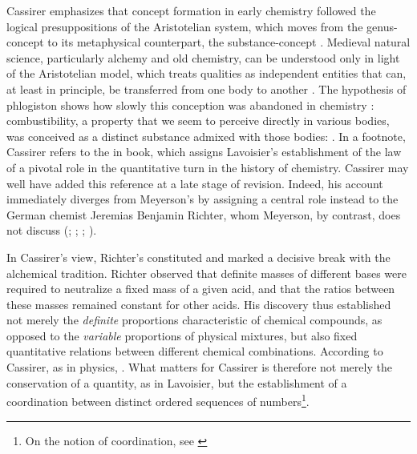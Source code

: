 \documentclass[submitted,12pt]{article}
\begin{document}
Cassirer emphasizes that concept formation in early chemistry followed the logical presuppositions of the Aristotelian system, which moves from the genus-concept  to its metaphysical counterpart, the substance-concept \origg{\SB}. Medieval natural science, particularly alchemy and old chemistry, can be understood only in light of the Aristotelian model, which treats qualities as independent entities that can, at least in principle, be transferred from one body to another . The hypothesis of phlogiston shows how slowly this conception was abandoned in chemistry : combustibility, a property that we seem to perceive directly in various bodies, was conceived as a distinct substance admixed with those bodies:  . In a footnote, Cassirer refers to the  in  book, which assigns Lavoisier's establishment of the law of  a pivotal role in the quantitative turn in the history of chemistry. Cassirer may well have added this reference at a late stage of revision. Indeed, his account immediately diverges from Meyerson's by assigning a central role instead to the German chemist Jeremias Benjamin Richter, whom Meyerson, by contrast, does not discuss (\cite[see][II.III]{Duhem1902}; \cite[lect.~4]{Ladenburg1902}; \cite[I.I]{Wurtz1879}; \cite[44--49]{Ostwald1906Leitlinien}). 

In Cassirer's view, Richter's  constituted   and marked a decisive break with the alchemical tradition. Richter observed that definite masses of different bases were required to neutralize a fixed mass of a given acid, and that the ratios between these masses remained constant for other acids. His discovery thus established not merely the \emph{definite} proportions characteristic of chemical compounds, as opposed to the \emph{variable} proportions of physical mixtures, but also fixed quantitative relations between different chemical combinations. According to Cassirer, as in physics,  . What matters for Cassirer is therefore not merely the conservation  of a quantity, as in Lavoisier, but the establishment of a coordination  between distinct ordered sequences of numbers\footnote{On the notion of coordination, see \citet{Ryckman1991}}. 
\end{document}
